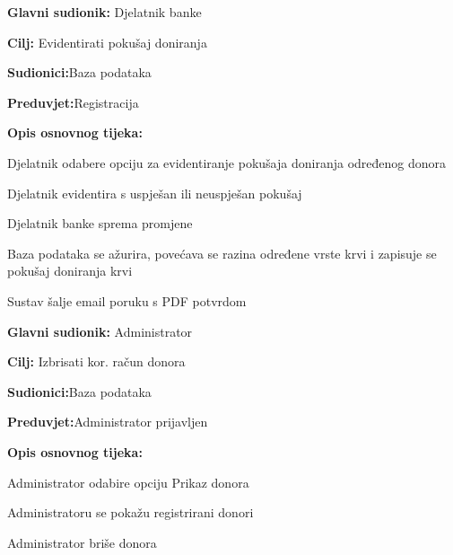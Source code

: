 \noindent {}
\begin{packed_item}
	
	\item \textbf{Glavni sudionik: }{Djelatnik banke}
	\item  \textbf{Cilj:} {Evidentirati pokušaj doniranja}
	\item  \textbf{Sudionici:}{Baza podataka} 
	\item  \textbf{Preduvjet:}{Registracija}
	\item  \textbf{Opis osnovnog tijeka:}
	
	\item[] \begin{packed_enum}
		
		\item {Djelatnik odabere opciju za evidentiranje pokušaja doniranja određenog donora}
		\item {Djelatnik evidentira s uspješan ili neuspješan pokušaj}
		\item {Djelatnik banke sprema promjene}
		\item {Baza podataka se ažurira, povećava se razina određene vrste krvi i zapisuje se pokušaj doniranja krvi}
		\item {Sustav šalje email poruku s PDF potvrdom}
		
	\end{packed_enum}
	
\end{packed_item}
\eject 
\noindent {}
\begin{packed_item}
	
	\item \textbf{Glavni sudionik: }{Administrator}
	\item  \textbf{Cilj:} {Izbrisati kor. račun donora}
	\item  \textbf{Sudionici:}{Baza podataka}
	\item  \textbf{Preduvjet:}{Administrator prijavljen}
	\item  \textbf{Opis osnovnog tijeka:}
	
	\item[] \begin{packed_enum}
		
		\item {Administrator odabire opciju Prikaz donora}
		\item {Administratoru se pokažu registrirani donori} 
		\item {Administrator briše donora}
		
	\end{packed_enum}
	
\end{packed_item}

